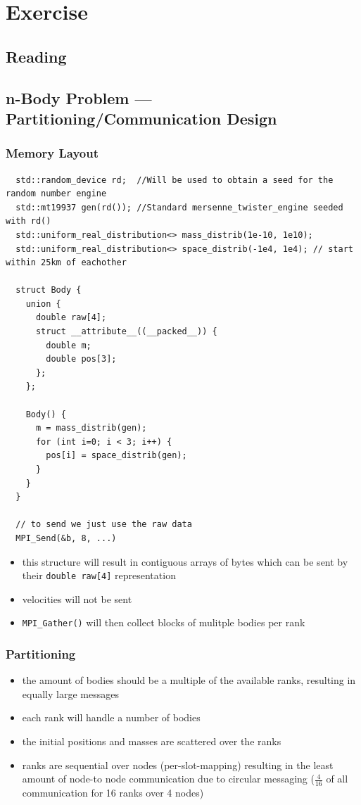 \documentclass[]{scrartcl}
\newcommand{\exercise}{Exercise \thesection}
\begin{document}
\section*{\exercise}

\subsection{Reading}
\subsection{n-Body Problem --- Partitioning/Communication Design}
\subsubsection{Memory Layout}

\begin{verbatim}
  std::random_device rd;  //Will be used to obtain a seed for the random number engine
  std::mt19937 gen(rd()); //Standard mersenne_twister_engine seeded with rd()
  std::uniform_real_distribution<> mass_distrib(1e-10, 1e10);
  std::uniform_real_distribution<> space_distrib(-1e4, 1e4); // start within 25km of eachother

  struct Body {
    union {
      double raw[4];
      struct __attribute__((__packed__)) {
        double m;
        double pos[3];
      };
    };

    Body() {
      m = mass_distrib(gen);
      for (int i=0; i < 3; i++) {
        pos[i] = space_distrib(gen);
      }
    }
  }

  // to send we just use the raw data
  MPI_Send(&b, 8, ...)
\end{verbatim}

\begin{itemize}
  \item this structure will result in contiguous arrays of bytes which can be sent by their \verb|double raw[4]| representation
  \item velocities will not be sent
  \item \verb|MPI_Gather()| will then collect blocks of mulitple bodies per rank
\end{itemize}

\subsubsection{Partitioning}

\begin{itemize}
  \item the amount of bodies should be a multiple of the available ranks, resulting in equally large messages
  \item each rank will handle a number of bodies
  \item the initial positions and masses are scattered over the ranks
  \item ranks are sequential over nodes (per-slot-mapping) resulting in the least amount of node-to node communication due to circular messaging ($\frac{4}{16}$ of all communication for 16 ranks over 4 nodes)
\end{itemize}
\end{document}
